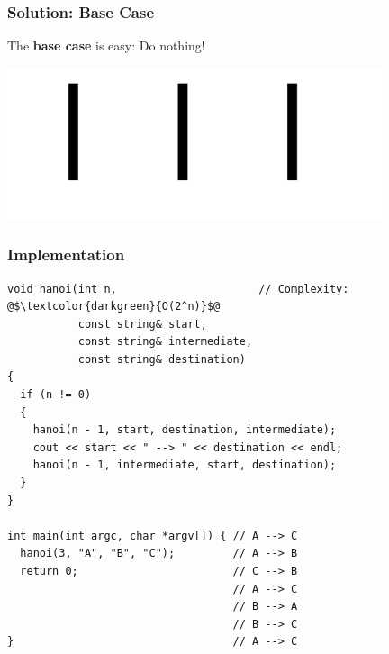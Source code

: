 \documentclass{beamer}
\begin{document}
\begin{frame}[containsverbatim]
\frametitle{Solution: Base Case}

The \textbf{base case} is easy: Do nothing!

\begin{center}
\includegraphics[width=11cm]{hanoi_base_case.pdf}
\end{center}

\end{frame}


\begin{frame}[containsverbatim]
\frametitle{Implementation}
\scriptsize
\begin{lstlisting}
void hanoi(int n,                      // Complexity: @$\textcolor{darkgreen}{O(2^n)}$@
           const string& start,
           const string& intermediate,
           const string& destination)
{
  if (n != 0)
  {
    hanoi(n - 1, start, destination, intermediate);
    cout << start << " --> " << destination << endl;
    hanoi(n - 1, intermediate, start, destination);
  }
}

int main(int argc, char *argv[]) { // A --> C
  hanoi(3, "A", "B", "C");         // A --> B
  return 0;                        // C --> B
                                   // A --> C
                                   // B --> A
                                   // B --> C
}                                  // A --> C
\end{lstlisting}

\end{frame}
\end{document}
